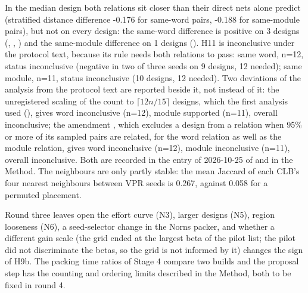 In the median design both relations sit closer than their direct nets alone predict (stratified distance difference
-0.176 for same-word pairs, -0.188 for same-module pairs), but not on every design: the same-word difference is positive on
3 designs (, , ) and the same-module difference on 1 designs (). H11 is inconclusive under the protocol text, because its rule needs both
relations to pass: same word, n=12, status inconclusive (negative in two of three seeds on 9 designs, 12 needed);
same module, n=11, status inconclusive (10 designs, 12 needed). Two deviations of the analysis from the protocol text are reported
beside it, not instead of it: the unregistered scaling of the count to $\lceil 12n/15\rceil$ designs, which the first analysis used
(), gives word inconclusive (n=12), module supported (n=11), overall inconclusive; the amendment , which excludes a design from a relation when 95\% or more of its
sampled pairs are related, for the word relation as well as the module relation, gives word inconclusive (n=12), module inconclusive (n=11), overall inconclusive. Both are recorded in the entry of
2026-10-25 of  and in the Method. The neighbours are only partly stable: the mean Jaccard of
each CLB's four nearest neighbours between VPR seeds is 0.267, against 0.058 for a permuted placement.


Round three leaves open the effort curve (N3), larger designs (N5), region looseness (N6), a seed-selector change in the Norns packer, and whether a different gain scale (the grid ended at the largest beta of the pilot list; the pilot did not discriminate the betas, so the grid is not informed by it) changes the sign of H9b. The packing time ratios of Stage 4 compare two builds and the proposal step has the counting and ordering limits described in the Method, both to be fixed in round 4.
